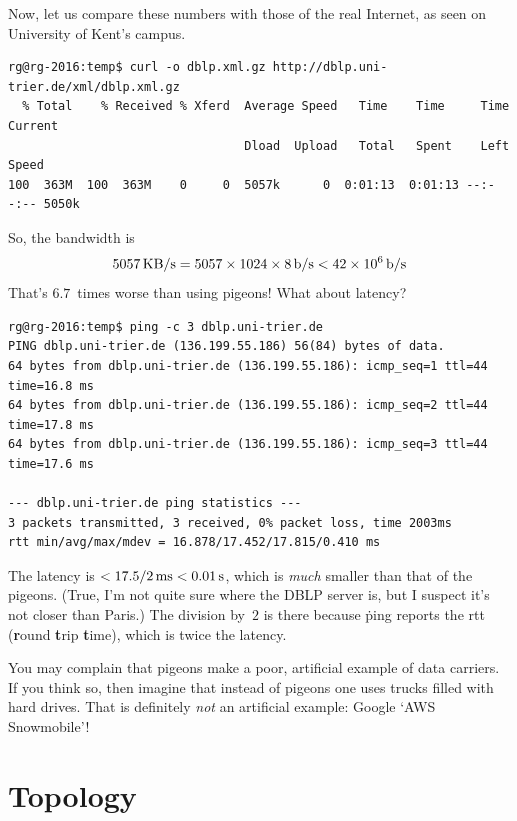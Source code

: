 Now, let us compare these numbers with those of the real Internet,
  as seen on University of Kent's campus.
\begin{verbatim}
rg@rg-2016:temp$ curl -o dblp.xml.gz http://dblp.uni-trier.de/xml/dblp.xml.gz
  % Total    % Received % Xferd  Average Speed   Time    Time     Time  Current
                                 Dload  Upload   Total   Spent    Left  Speed
100  363M  100  363M    0     0  5057k      0  0:01:13  0:01:13 --:--:-- 5050k
\end{verbatim}
So, the bandwidth is
\[
  5057\,{\rm KB}/{\rm s} = 5057\times1024\times8\,{\rm b}/{\rm s}
    < 42\times10^6\,{\rm b}/{\rm s}
\]
That's $6.7$~times worse than using pigeons!
What about latency?
\begin{verbatim}
rg@rg-2016:temp$ ping -c 3 dblp.uni-trier.de
PING dblp.uni-trier.de (136.199.55.186) 56(84) bytes of data.
64 bytes from dblp.uni-trier.de (136.199.55.186): icmp_seq=1 ttl=44 time=16.8 ms
64 bytes from dblp.uni-trier.de (136.199.55.186): icmp_seq=2 ttl=44 time=17.8 ms
64 bytes from dblp.uni-trier.de (136.199.55.186): icmp_seq=3 ttl=44 time=17.6 ms

--- dblp.uni-trier.de ping statistics ---
3 packets transmitted, 3 received, 0% packet loss, time 2003ms
rtt min/avg/max/mdev = 16.878/17.452/17.815/0.410 ms
\end{verbatim}
The latency is $<17.5/2\,{\rm ms}<0.01\,{\rm s}$,
  which is \emph{much} smaller than that of the pigeons.
(True, I'm not quite sure where the DBLP server is,
  but I suspect it's not closer than Paris.)
The division by~$2$ is there because \.{ping} reports
  the rtt ({\bf r}ound {\bf t}rip {\bf t}ime),
  which is twice the latency.

You may complain that pigeons make a poor, artificial example of data carriers.
If you think so,
  then imagine that instead of pigeons one uses trucks filled with hard drives.
That is definitely \emph{not} an artificial example:
  Google `AWS Snowmobile'!


\section{Topology}

